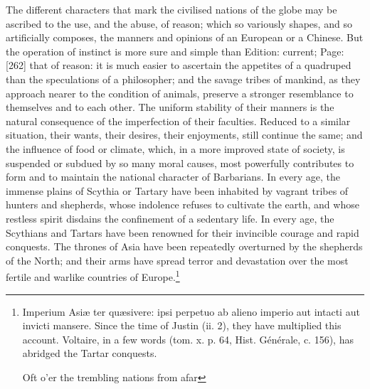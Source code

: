 The different characters that mark the civilised nations of the globe may be ascribed to the use, and the abuse, of reason; which so variously shapes, and so artificially composes, the manners and opinions of an European or a Chinese. But the operation of instinct is more sure and simple than Edition: current; Page: [262] that of reason: it is much easier to ascertain the appetites of a quadruped than the speculations of a philosopher; and the savage tribes of mankind, as they approach nearer to the condition of animals, preserve a stronger resemblance to themselves and to each other. The uniform stability of their manners is the natural consequence of the imperfection of their faculties. Reduced to a similar situation, their wants, their desires, their enjoyments, still continue the same; and the influence of food or climate, which, in a more improved state of society, is suspended or subdued by so many moral causes, most powerfully contributes to form and to maintain the national character of Barbarians. In every age, the immense plains of Scythia or Tartary have been inhabited by vagrant tribes of hunters and shepherds, whose indolence refuses to cultivate the earth, and whose restless spirit disdains the confinement of a sedentary life. In every age, the Scythians and Tartars have been renowned for their invincible courage and rapid conquests. The thrones of Asia have been repeatedly overturned by the shepherds of the North; and their arms have spread terror and devastation over the most fertile and warlike countries of Europe.\footnote{Imperium Asiæ ter quæsivere: ipsi perpetuo ab alieno imperio aut intacti aut invicti mansere. Since the time of Justin (ii. 2), they have multiplied this account. Voltaire, in a few words (tom. x. p. 64, Hist. Générale, c. 156), has abridged the Tartar conquests.

Oft o\texthebrew{}’er the trembling nations from afar

}
